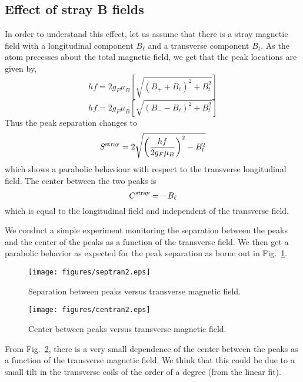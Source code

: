 \subsection{Effect of stray B fields}
In order to understand this effect, let us assume that there is a stray magnetic field with a longitudinal component $B_{\ell}$ and a transverse component $B_t$. As the atom precesses about the total magnetic field, we get that the peak locations are given by,
\begin{equation*}
hf = 2g_F \mu_B \left[\sqrt{ \left( B_+ + B_{\ell} \right)^2 + B_t^2} \right]
\end{equation*}
\begin{equation*}
hf = 2g_F \mu_B \left[\sqrt{(B_- - B_{\ell})^2 + B_t^2}\right]
\end{equation*}
Thus the peak separation changes to 
\begin{equation*}
S^{\rm stray} = 2\sqrt{\left(\dfrac{hf}{2g_F \mu_B}\right)^2 - B_t^2}
\end{equation*}
which shows a parabolic behaviour with respect to the transverse longitudinal field.
The center between the two peaks is
\begin{equation*}
C^{\rm stray} = -B_{\ell}
\end{equation*}
which is equal to the longitudinal field and independent of the transverse field. 

We conduct a simple experiment monitoring the separation between the peaks and the center of the peaks as a function of the transverse field. We then get a parabolic behavior as expected for the peak separation as borne out in Fig.~\ref{fig:septran}.

\begin{figure}
	\centering
	\texttt{[image: figures/septran2.eps]}
	\caption{Separation between peaks versus transverse magnetic field.}
	\label{fig:septran}
\end{figure}


\begin{figure}
	\centering
	\texttt{[image: figures/centran2.eps]}
	\caption{Center  between peaks versus transverse magnetic field.}
	\label{fig:centran}
\end{figure}



 From Fig.~\ref{fig:centran}, there is a very small dependence of the center between the peaks as a function of the transverse magnetic field. We think that this could be due to a small tilt in the transverse coils of the order of a degree (from the linear fit).

